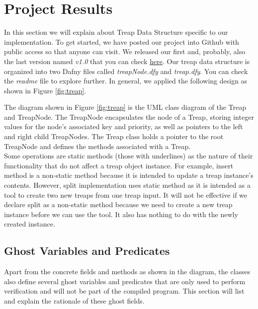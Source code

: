 \newpage
\section{Project Results}
\setcounter{subsection}{0}

In this section we will explain about Treap Data Structure specific to our implementation. To get started, we have posted our project into Github with public access so that anyone can visit. We released our first and, probably, also the last version named \textit{v1.0} that you can check \href{https://github.com/achmadyogi/CS5232-Project/tree/v1.0}{here}. Our treap data structure is organized into two Dafny files called \textit{treapNode.dfy} and \textit{treap.dfy}. You can check the \textit{readme} file to explore further. In general, we applied the following design as shown in Figure \ref*{fig:treap}.\\


The diagram shown in Figure \ref*{fig:treap} is the UML class diagram of the Treap and TreapNode. The TreapNode encapsulates the node of a Treap, storing integer values for the node's associated key and priority, as well as pointers to the left and right child TreapNodes. The Treap class holds a pointer to the root TreapNode and defines the methods associated with a Treap.\\

Some operations are static methods (those with underlines) as the nature of their functionality that do not affect a treap object instance. For example, insert method is a non-static method because it is intended to update a treap instance's contents. However, split implementation uses static method as it is intended as a tool to create two new treaps from one treap input. It will not be effective if we declare split as a non-static method because we need to create a new treap instance before we can use the tool. It also has nothing to do with the newly created instance.\\

\subsection{Ghost Variables and Predicates}
Apart from the concrete fields and methods as shown in the diagram, the classes also define several ghost variables and predicates that are only used to perform verification and will not be part of the compiled program. This section will list and explain the rationale of these ghost fields.\\

